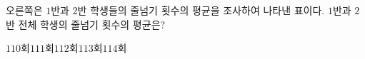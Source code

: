 \noindent\begin{minipage}[t]{0.58\linewidth}\vspace{0pt}\raggedright 오른쪽은 $1$반과 $2$반 학생들의 줄넘기 횟수의 평균을 조사하여 나타낸 표이다. $1$반과 $2$반 전체 학생의 줄넘기 횟수의 평균은?\end{minipage}\hfill\begin{minipage}[t]{0.4\linewidth}\vspace{0pt}\centering \resizebox{\ifdim\width>\linewidth\linewidth\else\width\fi}{!}{}\end{minipage}\par
\begin{choices32}{$110$회}{$111$회}{$112$회}{$113$회}{$114$회}\end{choices32}
